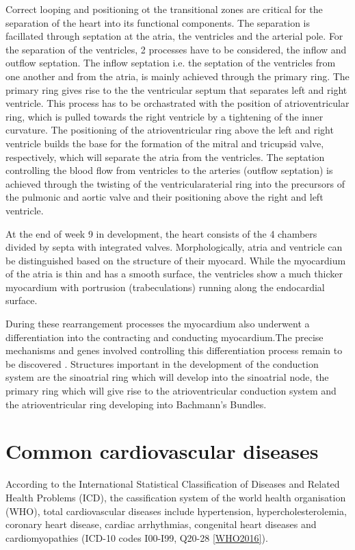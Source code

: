Correct looping and positioning ot the transitional zones are critical for the separation of the heart into its functional components. The separation is facillated through septation at the atria, the ventricles and the arterial pole. For the separation of the ventricles, \num{2} processes have to be considered, the inflow and outflow septation. The inflow septation i.e. the septation of the ventricles from one another and from the atria, is mainly achieved through the primary ring. The primary ring gives rise to the the ventricular septum that separates left and right ventricle. This process has to be orchastrated with the position of atrioventricular ring, which is pulled towards the right ventricle by a tightening of the inner curvature. The positioning of the atrioventricular ring above the left and right ventricle builds the base for the formation of the mitral and tricupsid valve, respectively, which will separate the atria from the ventricles.  The septation controlling the blood flow from ventricles to the arteries (outflow septation) is achieved through the twisting of the ventricularaterial ring into the precursors of the pulmonic and aortic valve and their positioning above the right and left ventricle.  

At the end of week \num{9} in development, the heart consists of the \num{4} chambers divided by septa with integrated valves. Morphologically, atria and ventricle can be distinguished based on the structure of their myocard. While the myocardium of the atria is thin and has a smooth surface, the ventricles show a much thicker myocardium with portrusion (trabeculations) running along the endocardial surface. 

During these rearrangement processes the myocardium also underwent a differentiation into the contracting and conducting myocardium.The precise mechanisms and genes involved controlling this differentiation process remain to be discovered \citep{}. Structures important in the development of the conduction system are the sinoatrial ring which will develop into the sinoatrial node, the primary ring which will give rise to the atrioventricular conduction system and the atrioventricular ring developing into Bachmann's Bundles. 

\section{Common cardiovascular diseases}
\label{subsection:CVD}
According to the International Statistical Classification of Diseases and Related Health Problems (ICD), the cassification system of the world health organisation (WHO), total cardiovascular diseases include hypertension, hypercholesterolemia, coronary heart disease, cardiac arrhythmias, congenital heart diseases and cardiomyopathies (ICD-10 codes I00-I99, Q20-28 \cref{WHO2016}). 

